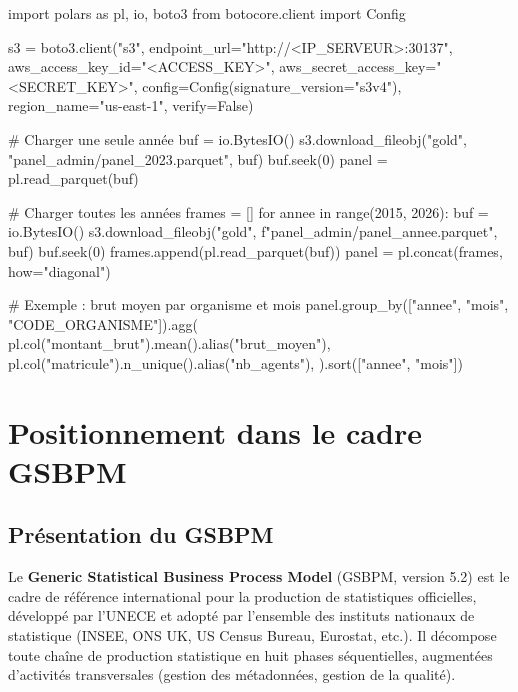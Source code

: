 \documentclass[12pt,a4paper,french]{report}
\begin{document}
\begin{codebox}
import polars as pl, io, boto3
from botocore.client import Config

s3 = boto3.client("s3", endpoint\_url="http://<IP_SERVEUR>:30137",
                  aws\_access\_key\_id="<ACCESS_KEY>",
                  aws\_secret\_access\_key="<SECRET_KEY>",
                  config=Config(signature\_version="s3v4"),
                  region\_name="us-east-1", verify=False)

# Charger une seule année
buf = io.BytesIO()
s3.download\_fileobj("gold", "panel\_admin/panel\_2023.parquet", buf)
buf.seek(0)
panel = pl.read\_parquet(buf)

# Charger toutes les années
frames = []
for annee in range(2015, 2026):
    buf = io.BytesIO()
    s3.download\_fileobj("gold", f"panel\_admin/panel\_{annee}.parquet", buf)
    buf.seek(0)
    frames.append(pl.read\_parquet(buf))
panel = pl.concat(frames, how="diagonal")

# Exemple : brut moyen par organisme et mois
panel.group\_by(["annee", "mois", "CODE\_ORGANISME"]).agg(
    pl.col("montant\_brut").mean().alias("brut\_moyen"),
    pl.col("matricule").n\_unique().alias("nb\_agents"),
).sort(["annee", "mois"])
\end{codebox}

\chapter{Positionnement dans le cadre GSBPM}

\section{Présentation du GSBPM}

Le \textbf{Generic Statistical Business Process Model} (GSBPM, version 5.2)
est le cadre de référence international pour la production de statistiques
officielles, développé par l'UNECE et adopté par l'ensemble des instituts
nationaux de statistique (INSEE, ONS UK, US Census Bureau, Eurostat, etc.).
Il décompose toute chaîne de production statistique en huit phases séquentielles,
augmentées d'activités transversales (gestion des métadonnées, gestion de la qualité).
\end{document}
